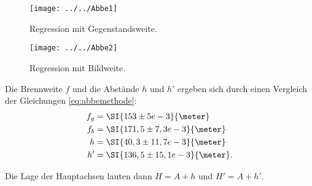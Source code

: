 \begin{figure}[h!]
	\centering
	\texttt{[image: ../../Abbe1]}
	\caption{Regression mit Gegenstandsweite.}
	\label{fig:abbe1}
\end{figure}

\begin{figure}
	\centering
	\texttt{[image: ../../Abbe2]}
	\caption{Regression mit Bildweite.}
	\label{fig:abbe2}
\end{figure}

Die Brennweite $f$ und die Abstände $h$ und $h'$ ergeben sich durch einen Vergleich der Gleichungen \ref{eq:abbemethode}:
\begin{align*}
f_g &= \SI{153 \pm 5 e-3}{\meter} \\
f_b &= \SI{171,5 \pm 7,3 e-3}{\meter} \\
h &= \SI{40,3 \pm 11,7 e-3}{\meter} \\
h' &= \SI{136,5 \pm 15,1 e-3}{\meter}.
\end{align*}

Die Lage der Hauptachsen lauten dann $H = A + h$ und $H' = A + h'$.